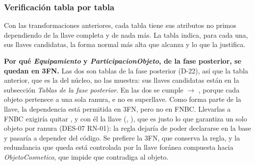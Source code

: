 \subsubsection*{Verificación tabla por tabla}

Con las transformaciones anteriores, cada tabla tiene sus atributos no primos dependiendo de la llave completa y de nada más. La tabla indica, para cada una, sus llaves candidatas, la forma normal más alta que alcanza y lo que la justifica.



\textbf{Por qué \textit{Equipamiento} y \textit{ParticipacionObjeto}, de la fase posterior, se quedan en 3FN.} Las dos son tablas de la fase posterior (\mbox{D-22}), así que la tabla anterior, que es la del núcleo, no las muestra: sus llaves candidatas están en la subsección \textit{Tablas de la fase posterior}. En las dos se cumple  $\rightarrow$ , porque cada objeto pertenece a una sola ranura, e  no es superllave. Como  forma parte de la llave, la dependencia está permitida en 3FN, pero no en FNBC. Llevarlas a FNBC exigiría quitar , y con él la llave (, ), que es justo lo que garantiza un solo objeto por ranura (\mbox{DES-07} \mbox{RN-01}): la regla dejaría de poder declararse en la base y pasaría a depender del código. Se prefiere la 3FN, que conserva la regla, y la redundancia que queda está controlada por la llave foránea compuesta hacia \textit{ObjetoCosmetico}, que impide que  contradiga al objeto.
